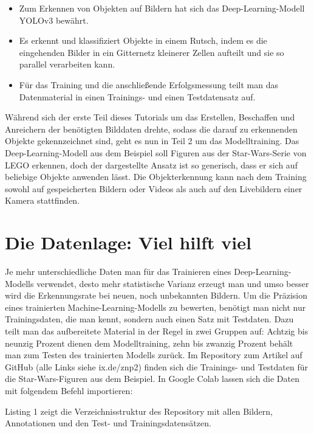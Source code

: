 \begin{itemize}
	\item Zum Erkennen von Objekten auf Bildern hat sich das Deep-Learning-Modell YOLOv3 bewährt. 
	\item Es erkennt und klassifiziert Objekte in einem Rutsch, indem es die eingehenden Bilder in ein Gitternetz kleinerer Zellen aufteilt und sie so parallel verarbeiten kann. 
	\item Für das Training und die anschließende Erfolgsmessung teilt man das Datenmaterial in einen Trainings- und einen Testdatensatz auf. 
\end{itemize}

Während sich der erste Teil dieses Tutorials um das Erstellen, Beschaffen und Anreichern der benötigten Bilddaten drehte, sodass die darauf zu erkennenden Objekte gekennzeichnet sind, geht es nun in Teil 2 um das Modelltraining. Das Deep-Learning-Modell aus dem Beispiel soll Figuren aus der Star-Wars-Serie von LEGO erkennen, doch der dargestellte Ansatz ist so generisch, dass er sich auf beliebige Objekte anwenden lässt. Die Objekterkennung kann nach dem Training sowohl auf gespeicherten Bildern oder Videos als auch auf den Livebildern einer Kamera stattfinden. 

\section{Die Datenlage: Viel hilft viel}

 
Je mehr unterschiedliche Daten man für das Trainieren eines Deep-Learning-Modells verwendet, desto mehr statistische Varianz erzeugt man und umso besser wird die Erkennungsrate bei neuen, noch unbekannten Bildern. 
	Um die Präzision eines trainierten Machine-Learning-Modells zu bewerten, benötigt man nicht nur Trainingsdaten, die man kennt, sondern auch einen Satz mit Testdaten. Dazu teilt man das aufbereitete Material in der Regel in zwei Gruppen auf: Achtzig bis neunzig Prozent dienen dem Modelltraining, zehn bis zwanzig Prozent behält man zum Testen des trainierten Modells zurück. Im Repository zum Artikel auf GitHub (alle Links siehe ix.de/znp2) finden sich die Trainings- und Testdaten für die Star-Wars-Figuren aus dem Beispiel. 
	In Google Colab lassen sich die Daten mit folgendem Befehl importieren: 
	


Listing 1 zeigt die Verzeichnisstruktur des Repository mit allen Bildern, Annotationen und den Test- und Trainingsdaten­sätzen. 

